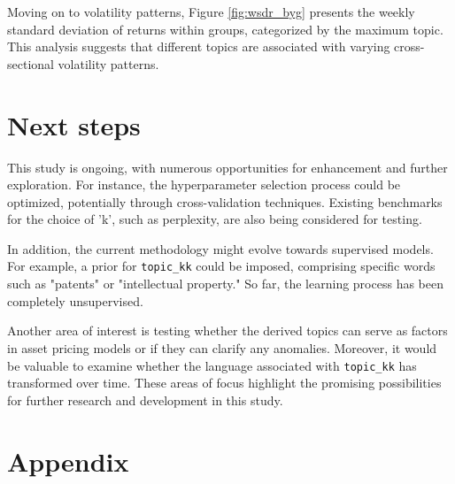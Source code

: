 \documentclass[12pt, letterpaper]{article}
\begin{document}

Moving on to volatility patterns, Figure \ref{fig:wsdr_byg} presents the weekly standard deviation of returns within groups, categorized by the maximum topic. This analysis suggests that different topics are associated with varying cross-sectional volatility patterns.


\section{Next steps}

This study is ongoing, with numerous opportunities for enhancement and further exploration. For instance, the hyperparameter selection process could be optimized, potentially through cross-validation techniques. Existing benchmarks for the choice of 'k', such as perplexity, are also being considered for testing.

In addition, the current methodology might evolve towards supervised models. For example, a prior for \texttt{topic\_kk} could be imposed, comprising specific words such as "patents" or "intellectual property." So far, the learning process has been completely unsupervised.

Another area of interest is testing whether the derived topics can serve as factors in asset pricing models or if they can clarify any anomalies. Moreover, it would be valuable to examine whether the language associated with \texttt{topic\_kk} has transformed over time. These areas of focus highlight the promising possibilities for further research and development in this study.

%
%
%
%
%



\section*{Appendix}
\end{document}
